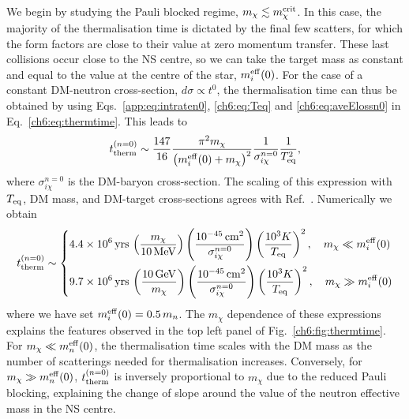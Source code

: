 We begin by studying the Pauli blocked regime, $m_\chi \lesssim m_\chi^{\rm crit}$. 
In this case, the majority of the thermalisation time is dictated by the final few scatters, for which the form factors are close to their value at zero momentum transfer.  These last collisions occur close to the NS centre, so we can take the target mass as constant and equal to the value at the centre of the star, $m_i^{\rm eff}(0)$. For the case of a constant DM-neutron cross-section, $d\sigma \propto t^0$, the thermalisation time can thus be obtained by using  Eqs.~\ref{app:eq:intraten0}, \ref{ch6:eq:Teq} and \ref{ch6:eq:aveElossn0} in Eq.~\ref{ch6:eq:thermtime}. This leads to
%
\small
\begin{equation}
  t_{\rm therm}^{(n=0)} \sim   \frac{147}{16 }\frac{\pi^2 m_\chi}{ \left(m_i^{\rm eff}(0) + m_\chi\right)^2}\frac{1}{\sigma_{i\chi}^{n=0}}\frac{1}{T_{\rm eq}^2}, 
  \label{ch6:eq:thermtimen0}
\end{equation} 
\normalsize
%
where $\sigma_{i\chi}^{n=0}$ is the DM-baryon cross-section. 
The scaling of this expression with $T_{\rm eq}$, DM mass, and DM-target cross-sections 
agrees with Ref.~\cite{Bertoni:2013bsa_dec_DarkMatterThermalization}. 
Numerically we obtain
\small
\begin{equation}
  t_{\rm therm}^{(n=0)} \sim \begin{dcases}
    4.4\times 10^{6}{\rm \,yrs} \, \left(\frac{m_\chi}{10{\rm \,MeV}}\right)\left(\frac{10^{-45}{\rm \,cm}^2}{\sigma_{i\chi}^{n=0}}\right)\left(\frac{10^3K}{T_{\rm eq}}\right)^{2},\quad m_\chi \ll m_i^{\rm eff}(0)\\
    9.7\times 10^{6}{\rm \,yrs} \, \left(\frac{10{\rm \,GeV}}{m_\chi}\right)\left(\frac{10^{-45}{\rm \,cm}^2}{\sigma_{i\chi}^{n=0}}\right)\left(\frac{10^3K}{T_{\rm eq}}\right)^{2},\quad m_\chi \gg m_i^{\rm eff}(0)
  \end{dcases} \label{ch6:eq:t_therm_0}
\end{equation}
\normalsize
%
where we have set $m_i^{\rm eff}(0) = 0.5\,m_n$. 
The $m_\chi$ dependence of these expressions explains the features observed in the top left panel of Fig.~\ref{ch6:fig:thermtime}. For $m_\chi \ll m_n^{\rm eff}(0)$, the thermalisation time scales with the DM mass as the number of scatterings needed for thermalisation increases. Conversely, for $m_\chi \gg m_n^{\rm eff}(0)$, $t_{\rm therm}^{(n=0)}$ is inversely proportional to $m_\chi$ due to the reduced Pauli blocking, explaining the change of slope around the value of the neutron effective mass in the NS centre. 




